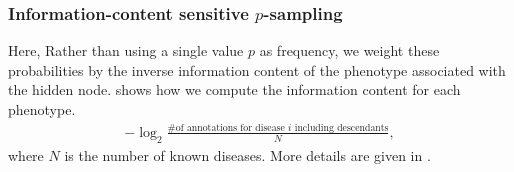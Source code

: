 \subsubsection{Information-content sensitive $p$-sampling}
%
Here, Rather than using a single value $p$ as frequency, we weight these
probabilities by the inverse information content of the phenotype
associated with the hidden node.  shows how
we compute the information content for each phenotype.
%
\begin{align}\label{eq:infocontent} 
    -\log_{2}\frac{\text{\# of annotations for disease } i \text{ including
    descendants}}{N},
\end{align}
where $N$ is the number of known diseases.
%
More details are given in .

